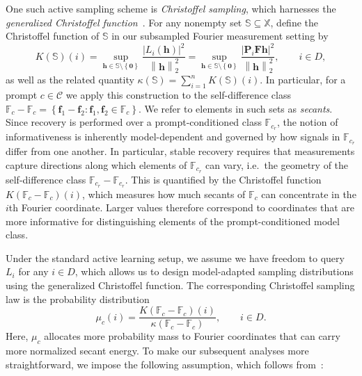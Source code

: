 \documentclass{article}
\theoremstyle{plain}
\theoremstyle{definition}
\theoremstyle{remark}
\begin{document}
One such active sampling scheme is \emph{Christoffel sampling}, which harnesses the \emph{generalized Christoffel function}~\cite{adcock2023cs4ml, adcock2025optimal}. For any nonempty set $\mathbb S\subseteq \mathbb X$, define the Christoffel function of $\mathbb S$ in our subsampled Fourier measurement setting by
\[
  K(\mathbb S)(i)
  =
  \sup_{\mathbf{h} \in \mathbb S\setminus\left\{ \mathbf{0} \right\}}
  \frac{\left| L_i(\mathbf{h}) \right|^2}{\left\| \mathbf{h} \right\|_2^2}
  =
  \sup_{\mathbf{h} \in \mathbb S\setminus\left\{ \mathbf{0} \right\}}
  \frac{\left| \mathbf{P}_i \mathbf{F}\mathbf{h} \right|^2}{\left\| \mathbf{h} \right\|_2^2},
  \qquad i \in D,
\]
as well as the related quantity $\kappa(\mathbb S) = \sum_{i=1}^n K(\mathbb S)(i)$. In particular, for a prompt $c \in \mathcal{C}$ we apply this construction to the self-difference class $\mathbb{F}_c - \mathbb{F}_c = \left\{ \mathbf{f}_1 - \mathbf{f}_2 : \mathbf{f}_1, \mathbf{f}_2 \in \mathbb{F}_c \right\}$. We refer to elements in such sets as \emph{secants}. Since recovery is performed over a prompt-conditioned class $\mathbb{F}_{c_r}$, the notion of informativeness is inherently model-dependent and governed by how signals in $\mathbb{F}_{c_r}$ differ from one another. In particular, stable recovery requires that measurements capture directions along which elements of $\mathbb{F}_{c_r}$ can vary, i.e.\ the geometry of the self-difference class $\mathbb{F}_{c_r} - \mathbb{F}_{c_r}$. This is quantified by the Christoffel function $K(\mathbb{F}_c - \mathbb{F}_c)(i)$, which measures how much secants of $\mathbb{F}_c$ can concentrate in the $i$th Fourier coordinate. Larger values therefore correspond to coordinates that are more informative for distinguishing elements of the prompt-conditioned model class.

Under the standard active learning setup, we assume we have freedom to query $L_i$ for any $i \in D$, which allows us to design model-adapted sampling distributions using the generalized Christoffel function. The corresponding Christoffel sampling law is the probability distribution
\begin{equation}\label{eq: christoffel sampling law}
  \mu_c(i)
  =
  \frac{K(\mathbb{F}_c - \mathbb{F}_c)(i)}{\kappa(\mathbb{F}_c - \mathbb{F}_c)},
  \qquad i \in D.
\end{equation}
Here, $\mu_c$ allocates more probability mass to Fourier coordinates that can carry more normalized secant energy. To make our subsequent analyses more straightforward, we impose the following assumption, which follows from~\cite[Assumption 2.2]{adcock2023cs4ml}:
\end{document}
